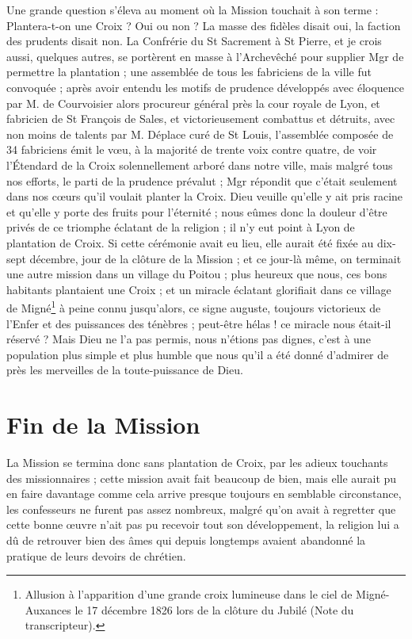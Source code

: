 \documentclass[11pt,a4paper]{report}
\begin{document}
Une grande question s'éleva au moment où la Mission touchait à son terme : Plantera-t-on une Croix ? Oui ou non ? La masse des fidèles disait oui, la faction des prudents disait non. La Confrérie du St Sacrement à St Pierre, et je crois aussi, quelques autres, se portèrent en masse à l'Archevêché pour supplier Mgr de permettre la plantation ; une assemblée de tous les fabriciens de la ville fut convoquée ; après avoir entendu les motifs de prudence développés avec éloquence par M. de Courvoisier alors procureur général près la cour royale de Lyon, et fabricien de St François de Sales, et victorieusement combattus et détruits, avec non moins de talents par M. Déplace curé de St Louis, l'assemblée composée de 34 fabriciens émit le vœu, à la majorité de trente voix contre quatre, de voir l'Étendard de la Croix solennellement arboré dans notre ville, mais malgré tous nos efforts, le parti de la prudence prévalut ; Mgr répondit que c'était seulement dans nos cœurs qu'il voulait planter la Croix. Dieu veuille qu'elle y ait pris racine et qu'elle y porte des fruits pour l'éternité ; nous eûmes donc la douleur d'être privés de ce triomphe éclatant de la religion ; il n'y eut point à Lyon de plantation de Croix. Si cette cérémonie avait eu lieu, elle aurait été fixée au dix-sept décembre, jour de la clôture de la Mission ; et ce jour-là même, on terminait une autre mission dans un village du Poitou ; plus heureux que nous, ces bons habitants plantaient une Croix ; et un miracle éclatant glorifiait dans ce village de Migné\footnote{Allusion à l'apparition d'une grande croix lumineuse dans le ciel de Migné-Auxances le 17 décembre 1826 lors de la clôture du Jubilé (Note du transcripteur).} à peine connu jusqu'alors, ce signe auguste, toujours victorieux de l'Enfer et des puissances des ténèbres ; peut-être hélas ! ce miracle nous était-il réservé ? Mais Dieu ne l'a pas permis, nous n'étions pas dignes, c'est à une population plus simple et plus humble que nous qu'il a été donné d'admirer de près les merveilles de la toute-puissance de Dieu.

\section*{Fin de la Mission}

La Mission se termina donc sans plantation de Croix, par les adieux touchants des missionnaires ; cette mission avait fait beaucoup de bien, mais elle aurait pu en faire davantage comme cela arrive presque toujours en semblable circonstance, les confesseurs ne furent pas assez nombreux, malgré qu'on avait à regretter que cette bonne œuvre n'ait pas pu recevoir tout son développement, la religion lui a dû de retrouver bien des âmes qui depuis longtemps avaient abandonné la pratique de leurs devoirs de chrétien.
\end{document}
